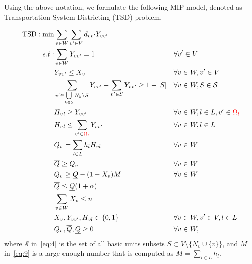 \documentclass[preprint,11pt]{elsarticle}
\begin{document}
Using the above notation, we formulate the following MIP model, denoted as Transportation System Districting (TSD) problem.

\allowdisplaybreaks[4]
\begin{align}
    \text{TSD}: \min & \sum_{v \in W} \sum_{v' \in V} d_{v v'} Y_{v v'} && \label{eq:1} \\
    s.t: & \sum_{v \in W} Y_{v v'} = 1 && \forall v' \in V \label{eq:2}  \\
    &Y_{v v'} \leq X_v && \forall v \in W, v' \in V \label{eq:3}   \\
    &\sum_{v' \in \bigcup\limits_{k \in S} N_{k} \setminus S} Y_{v v'} - \sum_{v' \in S} Y_{v v'} \geq 1 - |S| && \forall v \in W, S \in \mathcal{S} \label{eq:4}  \\
    &H_{vl} \geq Y_{v v'} && \forall v \in W, l \in L, v' \in \textcolor{red}{\Omega_l} \label{eq:5}   \\
    &H_{vl} \leq \sum_{v' \in \textcolor{red}{\Omega_l}} Y_{v v'} && \forall v \in W, l \in L \label{eq:6}   \\
    &Q_v = \sum_{l \in L} h_l H_{vl} && \forall v \in W \label{eq:7} \\
    &\overline{Q} \geq Q_v && \forall v \in W \label{eq:8}   \\
    & Q_v \geq \underline{Q} - (1 - X_v) M && \forall v \in W \label{eq:9} \\
    &\overline{Q} \leq \underline{Q} (1 + \alpha) \label{eq:10}  \\
    &\sum_{v \in W} X_v \leq n \label{eq:11}   \\
    &X_{v}, Y_{v v'}, H_{vl} \in \{0,1\}&& \forall v \in W, v' \in V, l \in L \label{eq:12}   \\
    &Q_v, \overline{Q}, \underline{Q} \geq 0 && \forall v \in W, \label{eq:13}
\end{align}
where $\mathcal{S}$ in~\eqref{eq:4} is the set of all basic units subsets $S \subset V \setminus \{ N_{v} \cup \{ v \} \}$, and $M$ in~\eqref{eq:9} is a large enough number that is computed as $M = \sum_{l \in L} h_l$.
\end{document}
